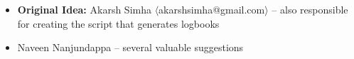\begin{itemize}
\item \textbf{Original Idea:} Akarsh Simha
  $\langle$akarshsimha@gmail.com$\rangle$ -- also responsible for
  creating the script that generates logbooks
\item Naveen Nanjundappa -- several valuable suggestions
\end{itemize}
